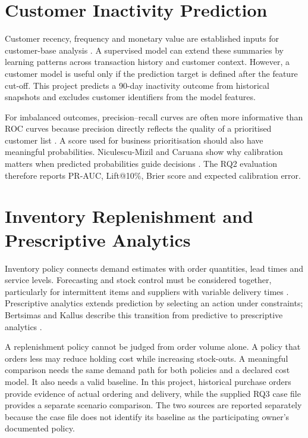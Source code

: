 \section{Customer Inactivity Prediction}
Customer recency, frequency and monetary value are established inputs for customer-base analysis \citep{fader2005rfm}. A supervised model can extend these summaries by learning patterns across transaction history and customer context. However, a customer model is useful only if the prediction target is defined after the feature cut-off. This project predicts a 90-day inactivity outcome from historical snapshots and excludes customer identifiers from the model features.

For imbalanced outcomes, precision--recall curves are often more informative than ROC curves because precision directly reflects the quality of a prioritised customer list \citep{saito2015pr}. A score used for business prioritisation should also have meaningful probabilities. Niculescu-Mizil and Caruana show why calibration matters when predicted probabilities guide decisions \citep{niculescu2005calibration}. The RQ2 evaluation therefore reports PR-AUC, Lift@10\%, Brier score and expected calibration error.

\section{Inventory Replenishment and Prescriptive Analytics}
Inventory policy connects demand estimates with order quantities, lead times and service levels. Forecasting and stock control must be considered together, particularly for intermittent items and suppliers with variable delivery times \citep{syntetos2010stock}. Prescriptive analytics extends prediction by selecting an action under constraints; Bertsimas and Kallus describe this transition from predictive to prescriptive analytics \citep{bertsimas2020prescriptive}.

A replenishment policy cannot be judged from order volume alone. A policy that orders less may reduce holding cost while increasing stock-outs. A meaningful comparison needs the same demand path for both policies and a declared cost model. It also needs a valid baseline. In this project, historical purchase orders provide evidence of actual ordering and delivery, while the supplied RQ3 case file provides a separate scenario comparison. The two sources are reported separately because the case file does not identify its baseline as the participating owner's documented policy.

